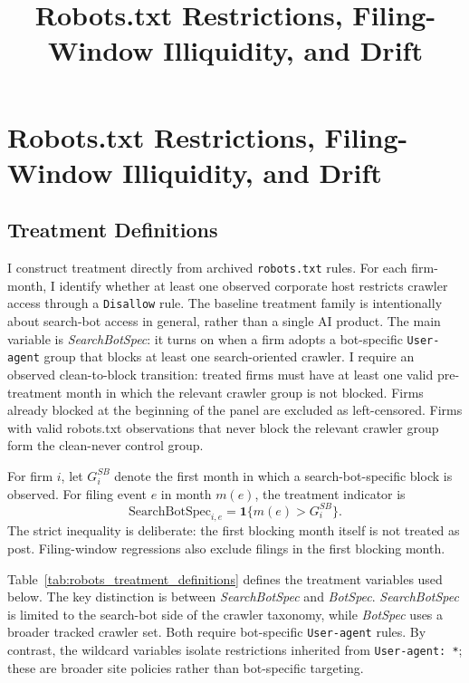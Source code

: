 \documentclass[11pt]{article}
\title{Robots.txt Restrictions, Filing-Window Illiquidity, and Drift}
\author{}
\date{}
\begin{document}
\maketitle

\section{Robots.txt Restrictions, Filing-Window Illiquidity, and Drift}
\label{sec:robots_txt_illiquidity_drift}

\subsection{Treatment Definitions}
\label{subsec:robots_treatment}

I construct treatment directly from archived \texttt{robots.txt} rules.
For each firm-month, I identify whether at least one observed corporate
host restricts crawler access through a \texttt{Disallow} rule.  The
baseline treatment family is intentionally about search-bot access in
general, rather than a single AI product.  The main variable is
\textit{SearchBotSpec}: it turns on when a firm adopts a bot-specific
\texttt{User-agent} group that blocks at least one search-oriented crawler.
I require an observed clean-to-block transition: treated firms must have
at least one valid pre-treatment month in which the relevant crawler group
is not blocked.  Firms already blocked at the beginning of the panel are
excluded as left-censored.  Firms with valid robots.txt observations that
never block the relevant crawler group form the clean-never control group.

For firm \(i\), let \(G_i^{SB}\) denote the first month in which a
search-bot-specific block is observed.  For filing event \(e\) in month
\(m(e)\), the treatment indicator is
\[
    \text{SearchBotSpec}_{i,e}
    =
    \mathbf{1}\{m(e)>G_i^{SB}\}.
\]
The strict inequality is deliberate: the first blocking month itself is
not treated as post.  Filing-window regressions also exclude filings in
the first blocking month.

Table~\ref{tab:robots_treatment_definitions} defines the treatment
variables used below.  The key distinction is between \textit{SearchBotSpec}
and \textit{BotSpec}.  \textit{SearchBotSpec} is limited to the search-bot
side of the crawler taxonomy, while \textit{BotSpec} uses a broader
tracked crawler set.  Both require bot-specific \texttt{User-agent} rules.
By contrast, the wildcard variables isolate restrictions inherited from
\texttt{User-agent: *}; these are broader site policies rather than
bot-specific targeting.
\end{document}
